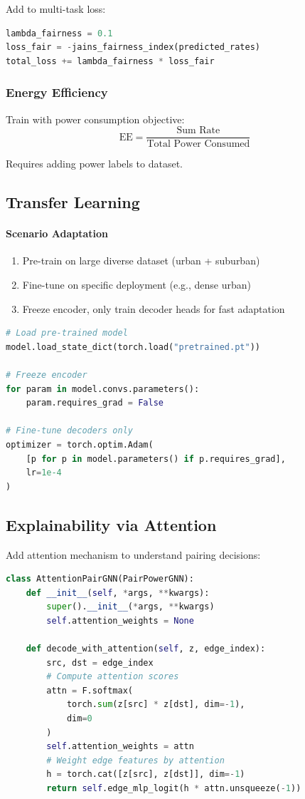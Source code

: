 \documentclass[12pt,a4paper]{article}
\begin{document}
Add to multi-task loss:
\begin{lstlisting}[language=Python]
lambda_fairness = 0.1
loss_fair = -jains_fairness_index(predicted_rates)
total_loss += lambda_fairness * loss_fair
\end{lstlisting}

\subsubsection{Energy Efficiency}
Train with power consumption objective:
\begin{equation}
\text{EE} = \frac{\text{Sum Rate}}{\text{Total Power Consumed}}
\end{equation}

Requires adding power labels to dataset.

\subsection{Transfer Learning}

\paragraph{Scenario Adaptation}
\begin{enumerate}
    \item Pre-train on large diverse dataset (urban + suburban)
    \item Fine-tune on specific deployment (e.g., dense urban)
    \item Freeze encoder, only train decoder heads for fast adaptation
\end{enumerate}

\begin{lstlisting}[language=Python]
# Load pre-trained model
model.load_state_dict(torch.load("pretrained.pt"))

# Freeze encoder
for param in model.convs.parameters():
    param.requires_grad = False

# Fine-tune decoders only
optimizer = torch.optim.Adam(
    [p for p in model.parameters() if p.requires_grad],
    lr=1e-4
)
\end{lstlisting}

\subsection{Explainability via Attention}

Add attention mechanism to understand pairing decisions:
\begin{lstlisting}[language=Python]
class AttentionPairGNN(PairPowerGNN):
    def __init__(self, *args, **kwargs):
        super().__init__(*args, **kwargs)
        self.attention_weights = None
    
    def decode_with_attention(self, z, edge_index):
        src, dst = edge_index
        # Compute attention scores
        attn = F.softmax(
            torch.sum(z[src] * z[dst], dim=-1), 
            dim=0
        )
        self.attention_weights = attn
        # Weight edge features by attention
        h = torch.cat([z[src], z[dst]], dim=-1)
        return self.edge_mlp_logit(h * attn.unsqueeze(-1))
\end{lstlisting}
\end{document}
